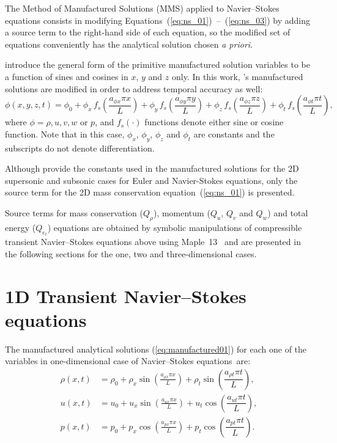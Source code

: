 \documentclass[10pt]{article}
\begin{document}
The Method of Manufactured Solutions (MMS) applied to Navier--Stokes equations consists in modifying Equations~(\ref{eq:ns_01})~--~(\ref{eq:ns_03}) by adding a source term to the right-hand side of each equation, so the modified set of equations conveniently has the analytical solution chosen \textit{a priori}.

\citet{Roy2002} introduce the general form of the primitive manufactured solution variables to be  a function of sines and cosines in $x$, $y$ and $z$ only. In this work, \citet{Roy2002}'s manufactured solutions are modified in order to address temporal accuracy as well:
\begin{equation}
 \label{eq:manufactured01}
  \phi (x,y,z,t) = \phi_0+ \phi_x\, f_s \left(\frac{a_{\phi x} \pi x}{L} \right) +  \phi_y \,f_s\left(\frac{a_{\phi y} \pi y}{L}\right) + \phi_z \,f_s\left(\frac{a_{\phi z} \pi z}{L}\right)+ \phi_t \,f_s\left(\frac{a_{\phi t} \pi t}{L}\right),
\end{equation}
where $\phi=\rho,u,v,w$ or $p$, and $f_s(\cdot)$ functions denote either sine or cosine function. Note that in this case, $\phi_x$, $\phi_y$, $\phi_z$  and $\phi_t$ are constants  and the subscripts do not denote differentiation.



Although \citet{Roy2002} provide the constants used in the manufactured solutions for the 2D supersonic and subsonic cases for Euler and Navier-Stokes equations, only the source term for the 2D mass conservation equation~(\ref{eq:ns_01}) is presented.


Source terms  for mass conservation ($Q_\rho$), momentum ($Q_u$, $Q_v$ and $Q_w$)  and total energy ($Q_{e_t}$) equations are obtained by symbolic manipulations of compressible transient Navier--Stokes equations above using Maple~13~\citep{Maple} and are presented in the following sections for the one, two and three-dimensional cases.


\section{1D Transient Navier--Stokes equations}

The manufactured analytical solutions (\ref{eq:manufactured01}) for each one of the variables in one-dimensional case of Navier--Stokes equations~are:
\begin{equation}
\begin{split}
\label{eq:manufactured_1d}
\rho\left(x,t\right) &=  \rho_{0}+ \rho_{x} \sin\left(\frac{a_{ \rho x} \pi x}{L}\right)+ \rho_t \sin\left(\dfrac{a_{\rho t} \pi t}{L}\right),\\
u\left(x,t\right) &= u_{0}+u_{x} \sin\left(\frac{a_{u x} \pi x}{L}\right) + u_t \cos\left(\dfrac{a_{u t} \pi t}{L}\right),\\
p\left(x,t\right) &= p_{0}+p_{x} \cos\left(\frac{a_{p x} \pi x}{L}\right)+ p_t \cos\left(\dfrac{a_{p t} \pi t}{L}\right).\\
\end{split}
\end{equation}
\end{document}
